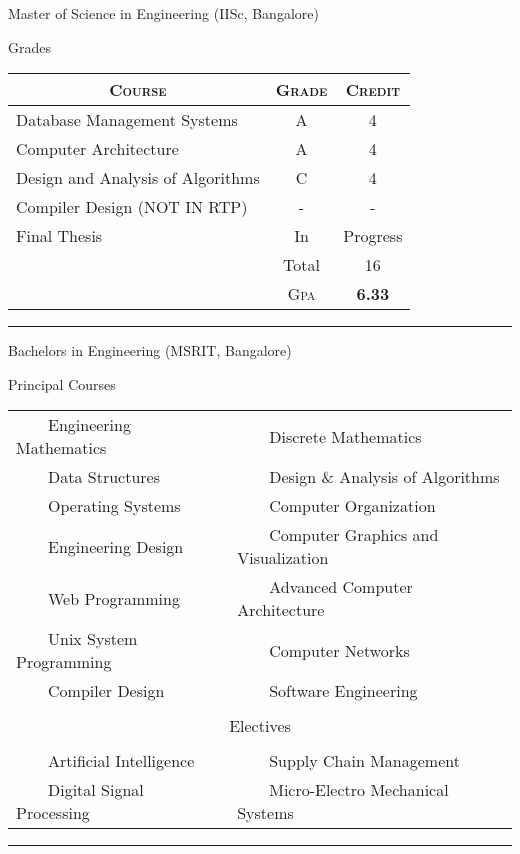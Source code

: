 \documentclass[a4paper,10pt]{article} %
\newcommand{\tabitem}{~~\llap{\textbullet}~~}
\begin{document}
\par{\centering\Large \hypertarget{iisc}{Master of Science in  Engineering (IISc, Bangalore)}\par}\large{\centering Grades\par}\normalsize

\begin{center}
\begin{tabular}{lcc}
\multicolumn{1}{c}{\textsc{Course}} & \textsc{Grade}&\textsc{Credit}\\ \hline
Database Management Systems & A & 4\\
Computer Architecture & A & 4\\
Design and Analysis of Algorithms & C & 4\\
Compiler Design (NOT IN RTP) & - & -\\
Final Thesis & In & Progress\\	
& Total & 16\\\cline{2-3}
&\textsc{Gpa}&\textbf{6.33}
\end{tabular}
\end{center}
\bigskip
\hrule
\bigskip


\bigskip

\par{\centering\Large \hypertarget{msrit}{Bachelors in Engineering (MSRIT, Bangalore) }\par}
\large{\centering Principal Courses\par}
\normalsize
\begin{center}
\begin{tabular}{ll}
\tabitem Engineering Mathematics & \tabitem Discrete Mathematics \\
\tabitem Data Structures & \tabitem Design \& Analysis of Algorithms \\
\tabitem Operating Systems & \tabitem Computer Organization \\
\tabitem Engineering Design & \tabitem Computer Graphics and Visualization \\
\tabitem Web Programming & \tabitem Advanced Computer Architecture \\
\tabitem Unix System Programming & \tabitem Computer Networks \\
\tabitem Compiler Design & \tabitem Software Engineering \\
&\\
\multicolumn{2}{c}{\large{\centering Electives\par}} \\ 
&\\
\tabitem Artificial Intelligence  & \tabitem Supply Chain Management  \\
\tabitem Digital Signal Processing & \tabitem Micro-Electro Mechanical Systems\\
\end{tabular}
\end{center}
\bigskip
\hrule
\bigskip
\end{document}
